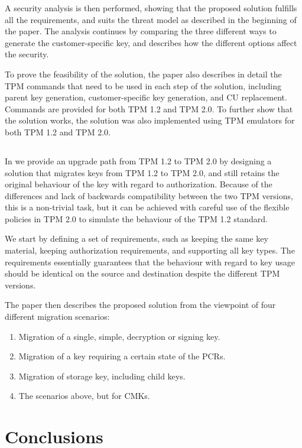 A security analysis is then performed, showing that the proposed solution fulfills all the requirements, and suits the threat model as described in the beginning of the paper.
The analysis continues by comparing the three different ways to generate the customer-specific key, and describes how the different options affect the security.

To prove the feasibility of the solution, the paper also describes in detail the TPM commands that need to be used in each step of the solution, including parent key generation, customer-specific key generation, and CU replacement.
Commands are provided for both TPM 1.2 and TPM 2.0.
To further show that the solution works, the solution was also implemented using TPM emulators for both TPM 1.2 and TPM 2.0.

\subsection{\paperIItitle}

In  we provide an upgrade path from TPM 1.2 to TPM 2.0 by designing a solution that migrates keys from TPM 1.2 to TPM 2.0, and still retains the original behaviour of the key with regard to authorization.
Because of the differences and lack of backwards compatibility between the two TPM versions, this is a non-trivial task, but it can be achieved with careful use of the flexible policies in TPM 2.0 to simulate the behaviour of the TPM 1.2 standard.

We start by defining a set of requirements, such as keeping the same key material, keeping authorization requirements, and supporting all key types.
The requirements essentially guarantees that the behaviour with regard to key usage should be identical on the source and destination despite the different TPM versions.

The paper then describes the proposed solution from the viewpoint of four different migration scenarios:
\begin{enumerate}
	\item Migration of a single, simple, decryption or signing key.
	\item Migration of a key requiring a certain state of the PCRs.
	\item Migration of storage key, including child keys.
	\item The scenarios above, but for CMKs.
\end{enumerate}

\section{Conclusions}
{ \raggedright
\printbibliography[segment=\therefsegment,heading=bibintoc]
}
